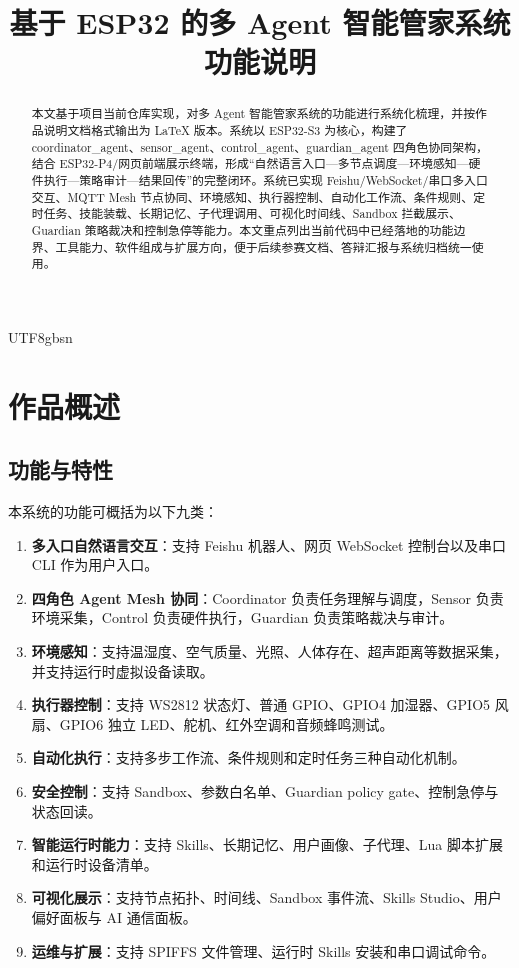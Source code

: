 \documentclass[a4paper,12pt]{article}
\title{基于 ESP32 的多 Agent 智能管家系统功能说明}
\author{}
\date{}
\begin{document}
\begin{CJK*}{UTF8}{gbsn}
\maketitle

\begin{abstract}
本文基于项目当前仓库实现，对多 Agent 智能管家系统的功能进行系统化梳理，并按作品说明文档格式输出为 \LaTeX{} 版本。系统以 ESP32-S3 为核心，构建了 coordinator\_agent、sensor\_agent、control\_agent、guardian\_agent 四角色协同架构，结合 ESP32-P4/网页前端展示终端，形成“自然语言入口---多节点调度---环境感知---硬件执行---策略审计---结果回传”的完整闭环。系统已实现 Feishu/WebSocket/串口多入口交互、MQTT Mesh 节点协同、环境感知、执行器控制、自动化工作流、条件规则、定时任务、技能装载、长期记忆、子代理调用、可视化时间线、Sandbox 拦截展示、Guardian 策略裁决和控制急停等能力。本文重点列出当前代码中已经落地的功能边界、工具能力、软件组成与扩展方向，便于后续参赛文档、答辩汇报与系统归档统一使用。
\end{abstract}

\section{作品概述}

\subsection{功能与特性}
本系统的功能可概括为以下九类：
\begin{enumerate}
  \item \textbf{多入口自然语言交互}：支持 Feishu 机器人、网页 WebSocket 控制台以及串口 CLI 作为用户入口。
  \item \textbf{四角色 Agent Mesh 协同}：Coordinator 负责任务理解与调度，Sensor 负责环境采集，Control 负责硬件执行，Guardian 负责策略裁决与审计。
  \item \textbf{环境感知}：支持温湿度、空气质量、光照、人体存在、超声距离等数据采集，并支持运行时虚拟设备读取。
  \item \textbf{执行器控制}：支持 WS2812 状态灯、普通 GPIO、GPIO4 加湿器、GPIO5 风扇、GPIO6 独立 LED、舵机、红外空调和音频蜂鸣测试。
  \item \textbf{自动化执行}：支持多步工作流、条件规则和定时任务三种自动化机制。
  \item \textbf{安全控制}：支持 Sandbox、参数白名单、Guardian policy gate、控制急停与状态回读。
  \item \textbf{智能运行时能力}：支持 Skills、长期记忆、用户画像、子代理、Lua 脚本扩展和运行时设备清单。
  \item \textbf{可视化展示}：支持节点拓扑、时间线、Sandbox 事件流、Skills Studio、用户偏好面板与 AI 通信面板。
  \item \textbf{运维与扩展}：支持 SPIFFS 文件管理、运行时 Skills 安装和串口调试命令。
\end{enumerate}


\end{CJK*}
\end{document}
